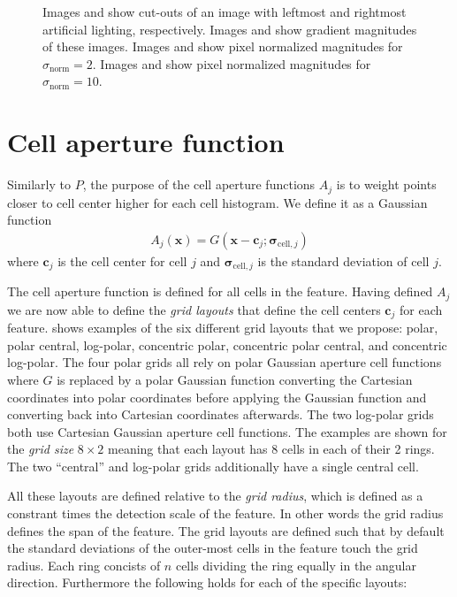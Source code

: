 \documentclass[thesis.tex]{subfiles}
\def\x{\mathbf{x}}
\def\c{\mathbf{c}}
\def\sigmacellj{\boldsymbol{\sigma}_{\text{cell},j}}
\begin{document}
\begin{figure}[p]
\begin{subfigure}[t]{0.48\textwidth}
        \caption{}
        \label{fig:pixelNormalizationExample8}
    \end{subfigure}
    \caption{Images  and  show cut-outs of an image with leftmost and rightmost artificial lighting, respectively. Images  and  show gradient magnitudes of these images. Images  and  show pixel normalized magnitudes for $\sigma_\text{norm} = 2$. Images  and  show pixel normalized magnitudes for $\sigma_\text{norm} = 10$.}
    \label{fig:pixelNormalizationExample}
\end{figure}
%
\section{Cell aperture function}
\label{sec:cellApertureFunction}
%
Similarly to $P$, the purpose of the cell aperture functions $A_j$ is to weight points closer to cell center higher for each cell histogram. We define it as a Gaussian function
%
\begin{align}
A_j(\x) = G(\x - \c_j; \sigmacellj)
\end{align}
%
where $\c_j$ is the cell center for cell $j$ and $\sigmacellj$ is the standard deviation of cell $j$.

The cell aperture function is defined for all cells in the feature. Having defined $A_j$ we are now able to define the \emph{grid layouts} that define the cell centers $\boldsymbol{c}_j$ for each feature.
 shows examples of the six different grid layouts that we propose: polar, polar central, log-polar, concentric polar, concentric polar central, and concentric log-polar. The four polar grids all rely on polar Gaussian aperture cell functions where $G$ is replaced by a polar Gaussian function converting the Cartesian coordinates into polar coordinates before applying the Gaussian function and converting back into Cartesian coordinates afterwards. The two log-polar grids both use Cartesian Gaussian aperture cell functions. The examples are shown for the \emph{grid size} $8\times 2$ meaning that each layout has 8 cells in each of their 2 rings. The two ``central'' and log-polar grids additionally have a single central cell.

All these layouts are defined relative to the \emph{grid radius}, which is defined as a constrant times the detection scale of the feature. In other words the grid radius defines the span of the feature. The grid layouts are defined such that by default the standard deviations of the outer-most cells in the feature touch the grid radius. Each ring concists of $n$ cells dividing the ring equally in the angular direction. Furthermore the following holds for each of the specific layouts:
\end{document}
